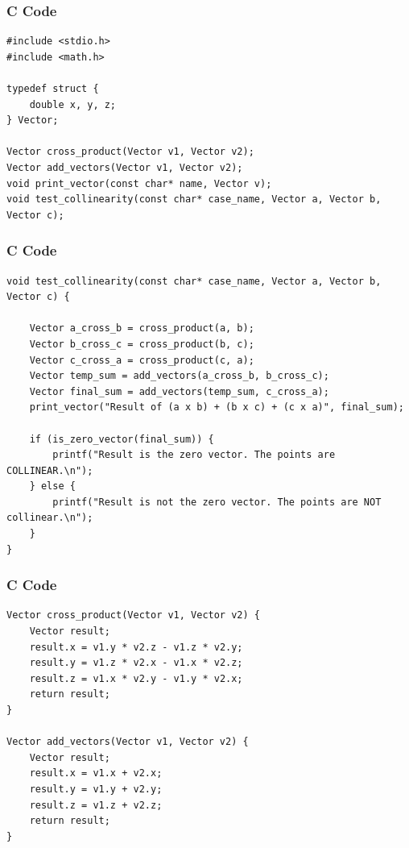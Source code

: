 \documentclass{beamer}
\begin{document}
\begin{frame}[fragile]
    \frametitle{C Code}

    \begin{lstlisting}
#include <stdio.h>
#include <math.h>

typedef struct {
    double x, y, z;
} Vector;

Vector cross_product(Vector v1, Vector v2);
Vector add_vectors(Vector v1, Vector v2);
void print_vector(const char* name, Vector v);
void test_collinearity(const char* case_name, Vector a, Vector b, Vector c);

    \end{lstlisting}
\end{frame}

\begin{frame}[fragile]
    \frametitle{C Code}

    \begin{lstlisting}
void test_collinearity(const char* case_name, Vector a, Vector b, Vector c) {
   
    Vector a_cross_b = cross_product(a, b);
    Vector b_cross_c = cross_product(b, c);
    Vector c_cross_a = cross_product(c, a);
    Vector temp_sum = add_vectors(a_cross_b, b_cross_c);
    Vector final_sum = add_vectors(temp_sum, c_cross_a);
    print_vector("Result of (a x b) + (b x c) + (c x a)", final_sum);

    if (is_zero_vector(final_sum)) {
        printf("Result is the zero vector. The points are COLLINEAR.\n");
    } else {
        printf("Result is not the zero vector. The points are NOT collinear.\n");
    }
}
    \end{lstlisting}
\end{frame}
\begin{frame}[fragile]
    \frametitle{C Code}

    \begin{lstlisting}
Vector cross_product(Vector v1, Vector v2) {
    Vector result;
    result.x = v1.y * v2.z - v1.z * v2.y;
    result.y = v1.z * v2.x - v1.x * v2.z;
    result.z = v1.x * v2.y - v1.y * v2.x;
    return result;
}

Vector add_vectors(Vector v1, Vector v2) {
    Vector result;
    result.x = v1.x + v2.x;
    result.y = v1.y + v2.y;
    result.z = v1.z + v2.z;
    return result;
}

    \end{lstlisting}
\end{frame}
\end{document}
